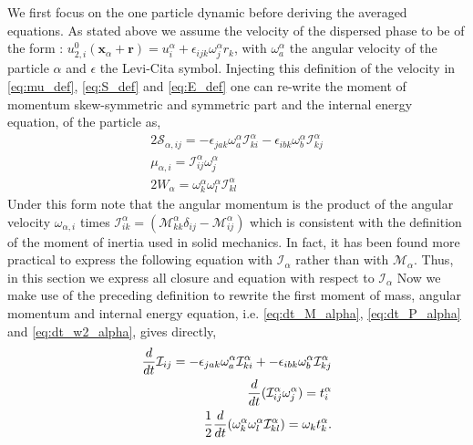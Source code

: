 We first focus on the one particle dynamic before deriving the averaged equations. 
As stated above we assume the velocity of the dispersed phase to be of the form : $u_{2,i}^0(\textbf{x}_\alpha + \textbf{r}) = u_{i}^\alpha + \epsilon_{ijk} {\omega}_{j}^\alpha {r}_k$, with $\omega_{a}^\alpha$ the angular velocity of the particle $\alpha$ and $\epsilon$ the Levi-Cita symbol.
Injecting this definition of the velocity in \ref{eq:mu_def}, \ref{eq:S_def} and \ref{eq:E_def} one can re-write the moment of momentum skew-symmetric and symmetric part and the internal energy equation, of the particle as,
\begin{align}
    2\mathcal{S}_{\alpha,ij}
    = - \epsilon_{jak} \omega_a^\alpha \mathcal{I}_{ki}^\alpha
      - \epsilon_{ibk} \omega_b^\alpha \mathcal{I}_{kj}^\alpha
    \\
    \mu_{\alpha,i}
    =  \mathcal{I}_{ij}^\alpha \omega^\alpha_j\\
    2W_\alpha 
    = \omega^\alpha_k\omega^\alpha_l \mathcal{I}_{kl}^\alpha
\end{align}
Under this form note that the angular momentum is the product of the angular velocity $\omega_{\alpha,i}$ times $\mathcal{I}_{ik}^\alpha = (\mathcal{M}_{kk}^\alpha \delta_{ij} - \mathcal{M}_{ij}^\alpha)$ which is consistent with the definition of the moment of inertia used in solid mechanics.
In fact, it has been found  more practical to express the following equation with $\mathcal{I}_\alpha$ rather than with $\mathcal{M}_\alpha$. 
Thus, in this section we express all closure and equation with respect to $\mathcal{I}_\alpha$
Now we make use of the preceding definition to rewrite the first moment of mass, angular momentum and internal energy equation, i.e. \ref{eq:dt_M_alpha}, \ref{eq:dt_P_alpha} and \ref{eq:dt_w2_alpha}, gives directly, 
\begin{align}
    \label{eq:dt_I_alpha}
    \ddt \mathcal{I}_{ij}
    = - \epsilon_{jak} \omega_a^\alpha \mathcal{I}_{ki}^\alpha + 
    - \epsilon_{ibk}   \omega_b^\alpha \mathcal{I}_{kj}^\alpha\\
    \label{eq:dt_Iomega_alpha}
    \ddt (\mathcal{I}_{ij}^\alpha \omega_j^\alpha)
    = t^\alpha_i\\
    \label{eq:dt_Iomegaomega_alpha}
    \frac{1}{2}\ddt (\omega^\alpha_k\omega^\alpha_l \mathcal{I}_{kl}^\alpha)
    = \omega_k t^\alpha_k. 
\end{align}
